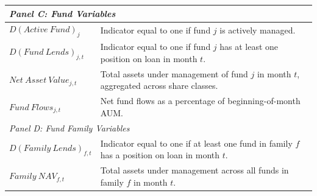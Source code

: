 \begin{table}[p]
\begin{center}
{\begin{tabular}{p{4.5cm}p{10cm}}
\midrule
\multicolumn{2}{l}{\textit{Panel C: Fund Variables}} \\
\midrule
$D(Active\ Fund)_j$ & Indicator equal to one if fund $j$ is actively managed. \\[0.3em]
$D(Fund\ Lends)_{j,t}$ & Indicator equal to one if fund $j$ has at least one position on loan in month $t$. \\[0.3em]
$Net\ Asset\ Value_{j,t}$ & Total assets under management of fund $j$ in month $t$, aggregated across share classes. \\[0.3em]
$Fund\ Flows_{j,t}$ & Net fund flows as a percentage of beginning-of-month AUM. \\[0.3em]
\midrule
\multicolumn{2}{l}{\textit{Panel D: Fund Family Variables}} \\
\midrule
$D(Family\ Lends)_{f,t}$ & Indicator equal to one if at least one fund in family $f$ has a position on loan in month $t$. \\[0.3em]
$Family\ NAV_{f,t}$ & Total assets under management across all funds in family $f$ in month $t$. \\[0.3em]
\bottomrule
\end{tabular}
}
\end{center}
\end{table}
